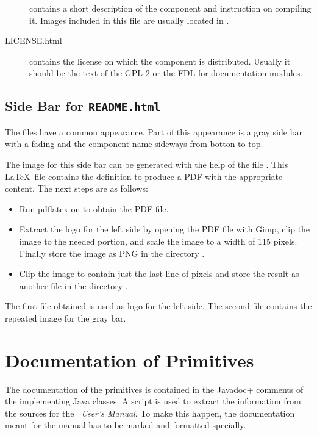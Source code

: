 \begin{description}
\item[] contains a short description of the
  component and instruction on compiling it. Images included in this
  file are usually located in .
\item[LICENSE.html] contains the license on which the component is
  distributed. Usually it should be the text of the GPL 2 or the FDL
  for documentation modules.
\end{description}

\subsection{Side Bar for \texttt{README.html}}

The files  have a common appearance. Part of this
appearance is a gray side bar with a fading and the component name
sideways from botton to top.

The image for this side bar can be generated with the help of the file
. This \LaTeX\ file contains the
definition to produce a PDF with the appropriate content. The next
steps are as follows:

\begin{itemize}
\item Run pdflatex on  to obtain the PDF file.
\item Extract the logo for the left side by opening the PDF file with
  Gimp, clip the image to the needed portion, and scale the image to a
  width of 115 pixels. Finally store the image as PNG in the
  directory . 
\item Clip the image to contain just the last line of pixels and store
  the result as another file in the directory .
\end{itemize}

The first file obtained is used as logo for the left side. The second
file contains the repeated image for the gray bar.

\section{Documentation of Primitives}

The documentation of the primitives is contained in the \+Javadoc+
comments of the implementing Java classes. A script is used to extract
the information from the sources for the \textit{\ExTeX\ User's
  Manual}. To make this happen, the documentation meant for the manual
has to be marked and formatted specially.

